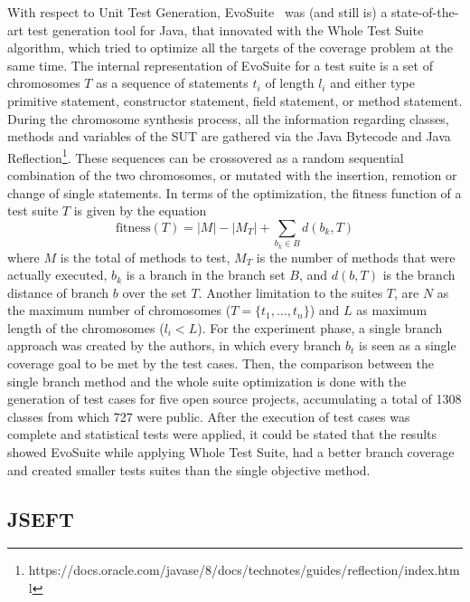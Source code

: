 \documentclass[%
  chapterprefix=false,%
  open=right,%
  twoside=true,%
  paper=a4,%
  logofile={Figures/logo.png},%
  thesistype=master,%
  UKenglish,%
]{se2thesis}
\begin{document}
With respect to Unit Test Generation, EvoSuite~\cite{DBLP:conf/qsic/FraserA11} was (and still is) a state-of-the-art test generation tool for Java, that innovated with the Whole Test Suite algorithm, which tried to optimize all the targets of the coverage problem at the same time.
The internal representation of EvoSuite for a test suite is a set of chromosomes \(T\) as a sequence of statements \(t_i\) of length \(l_i\) and either type primitive statement, constructor statement, field statement, or method statement.
During the chromosome synthesis process, all the information regarding classes, methods and variables of the SUT are gathered via the Java Bytecode and Java Reflection\footnote{https://docs.oracle.com/javase/8/docs/technotes/guides/reflection/index.html}.
These sequences can be crossovered as a random sequential combination of the two chromosomes, or mutated with the insertion, remotion or change of single statements.
In terms of the optimization, the fitness function of a test suite $T$ is given by the equation
\[ \text{fitness}(T) = |M| - |M_T| + \sum_{b_k \in B} d(b_k, T) \]
where \(M\) is the total of methods to test, \(M_T\) is the number of methods that were actually executed, \(b_k\) is a branch in the branch set \(B\), and \(d(b, T)\) is the branch distance of branch \(b\) over the set \(T\).
Another limitation to the suites \(T\), are \(N\) as the maximum number of chromosomes (\(T = \{t_1, \dots , t_n\}\)) and \(L\) as maximum length of the chromosomes (\(l_i < L\)).
For the experiment phase, a single branch approach was created by the authors, in which every branch \(b_t\) is seen as a single coverage goal to be met by the test cases.
Then, the comparison between the single branch method and the whole suite optimization is done with the generation of test cases for five open source projects, accumulating a total of 1308 classes from which 727 were public.
After the execution of test cases was complete and statistical tests were applied, it could be stated that the results showed EvoSuite while applying Whole Test Suite, had a better branch coverage and created smaller tests suites than the single objective method.

\subsection*{JSEFT}
\end{document}
